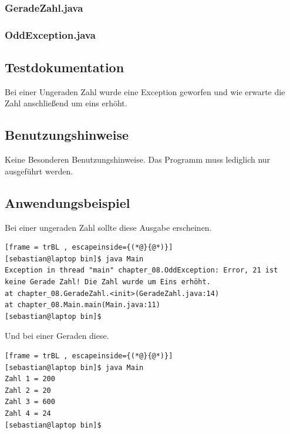 \subsubsection{GeradeZahl.java}

\subsubsection{OddException.java}


\subsection{Testdokumentation}
Bei einer Ungeraden Zahl wurde eine Exception geworfen und wie erwarte die Zahl
anschließend um eins erhöht.

\subsection{Benutzungshinweise}
Keine Besonderen Benutzungshinweise.
Das Programm muss lediglich nur ausgeführt werden.

\subsection{Anwendungsbeispiel}
Bei einer ungeraden Zahl sollte diese Ausgabe erscheinen.
\begin{lstlisting}[frame = trBL , escapeinside={(*@}{@*)}]
[sebastian@laptop bin]$ java Main
Exception in thread "main" chapter_08.OddException: Error, 21 ist keine Gerade Zahl! Die Zahl wurde um Eins erhöht.
at chapter_08.GeradeZahl.<init>(GeradeZahl.java:14)
at chapter_08.Main.main(Main.java:11)
[sebastian@laptop bin]$ 
\end{lstlisting}
Und bei einer Geraden diese.
\begin{lstlisting}[frame = trBL , escapeinside={(*@}{@*)}]
[sebastian@laptop bin]$ java Main
Zahl 1 = 200
Zahl 2 = 20
Zahl 3 = 600
Zahl 4 = 24
[sebastian@laptop bin]$ 
\end{lstlisting}